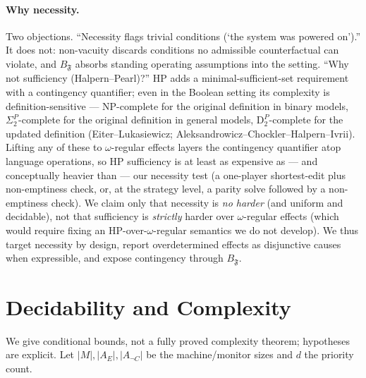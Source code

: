 \documentclass[11pt]{article}
\theoremstyle{remark}
\newcommand{\Frame}{\mathfrak{F}}
\begin{document}
\paragraph{Why necessity.} Two objections. ``Necessity flags trivial conditions
(`the system was powered on').'' It does not: non-vacuity discards conditions no
admissible counterfactual can violate, and \(B_{\Frame}\) absorbs standing
operating assumptions into the setting. ``Why not sufficiency (Halpern--Pearl)?''
HP adds a minimal-sufficient-set requirement with a contingency quantifier; even
in the Boolean setting its complexity is definition-sensitive --- NP-complete for
the original definition in binary models, \(\Sigma_2^P\)-complete for the original
definition in general models, \(\mathrm{D}_2^P\)-complete for the updated
definition (Eiter--Lukasiewicz; Aleksandrowicz--Chockler--Halpern--Ivrii). Lifting
any of these to \(\omega\)-regular effects layers the contingency quantifier atop
language operations, so HP sufficiency is at least as expensive as --- and
conceptually heavier than --- our necessity test (a one-player shortest-edit plus
non-emptiness check, or, at the strategy level, a parity solve followed by a
non-emptiness check). We claim only that necessity is \emph{no harder} (and uniform and
decidable), not that sufficiency is \emph{strictly} harder over \(\omega\)-regular
effects (which would require fixing an HP-over-\(\omega\)-regular semantics we do
not develop). We thus target necessity by design, report overdetermined effects as
disjunctive causes when expressible, and expose contingency through \(B_{\Frame}\).

\section{Decidability and Complexity}
\label{sec:complexity}

We give conditional bounds, not a fully proved complexity theorem; hypotheses are
explicit. Let \(|M|,|A_E|,|A_{\neg C}|\) be the machine/monitor sizes and \(d\) the
priority count.
\end{document}
